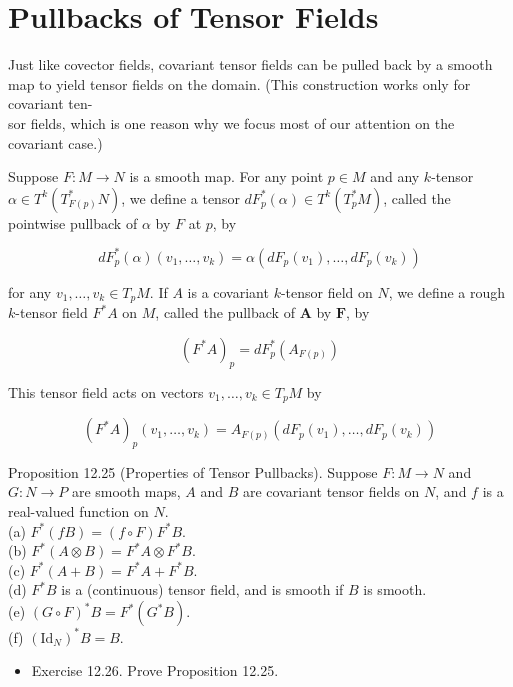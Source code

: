 \documentclass[10pt, letterpaper]{article}
\begin{document}
\pagebreak


\section*{Pullbacks of Tensor Fields}
Just like covector fields, covariant tensor fields can be pulled back by a smooth map to yield tensor fields on the domain. (This construction works only for covariant ten-\\
sor fields, which is one reason why we focus most of our attention on the covariant case.)

Suppose $F: M \rightarrow N$ is a smooth map. For any point $p \in M$ and any $k$-tensor $\alpha \in T^{k}\left(T_{F(p)}^{*} N\right)$, we define a tensor $d F_{p}^{*}(\alpha) \in T^{k}\left(T_{p}^{*} M\right)$, called the pointwise pullback of $\alpha$ by $F$ at $p$, by

$$
d F_{p}^{*}(\alpha)\left(v_{1}, \ldots, v_{k}\right)=\alpha\left(d F_{p}\left(v_{1}\right), \ldots, d F_{p}\left(v_{k}\right)\right)
$$

for any $v_{1}, \ldots, v_{k} \in T_{p} M$. If $A$ is a covariant $k$-tensor field on $N$, we define a rough $k$-tensor field $F^{*} A$ on $M$, called the pullback of $\boldsymbol{A}$ by $\boldsymbol{F}$, by

$$
\left(F^{*} A\right)_{p}=d F_{p}^{*}\left(A_{F(p)}\right)
$$

This tensor field acts on vectors $v_{1}, \ldots, v_{k} \in T_{p} M$ by

$$
\left(F^{*} A\right)_{p}\left(v_{1}, \ldots, v_{k}\right)=A_{F(p)}\left(d F_{p}\left(v_{1}\right), \ldots, d F_{p}\left(v_{k}\right)\right)
$$

Proposition 12.25 (Properties of Tensor Pullbacks). Suppose $F: M \rightarrow N$ and $G: N \rightarrow P$ are smooth maps, $A$ and $B$ are covariant tensor fields on $N$, and $f$ is a real-valued function on $N$.\\
(a) $F^{*}(f B)=(f \circ F) F^{*} B$.\\
(b) $F^{*}(A \otimes B)=F^{*} A \otimes F^{*} B$.\\
(c) $F^{*}(A+B)=F^{*} A+F^{*} B$.\\
(d) $F^{*} B$ is a (continuous) tensor field, and is smooth if $B$ is smooth.\\
(e) $(G \circ F)^{*} B=F^{*}\left(G^{*} B\right)$.\\
(f) $\left(\mathrm{Id}_{N}\right)^{*} B=B$.

\begin{itemize}
  \item Exercise 12.26. Prove Proposition 12.25.
\end{itemize}
\end{document}
